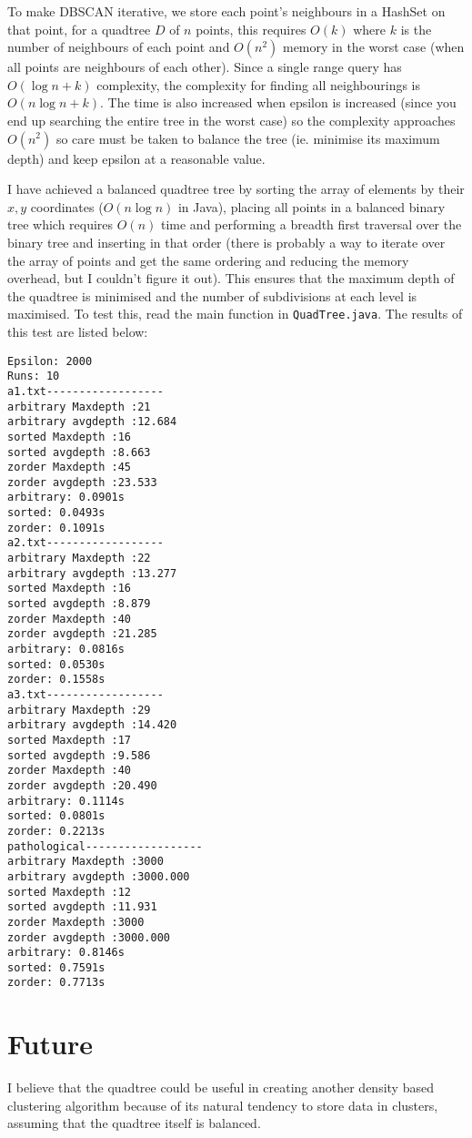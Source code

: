\documentclass{CRPITStyle}
\begin{document}
To make DBSCAN iterative, we store each point's neighbours in a HashSet on that point, for a quadtree $D$ of $n$ points, this requires $O(k)$ where $k$ is the number of neighbours of each point and $O(n^2)$ memory in the worst case (when all points are neighbours of each other). Since a single range query has $O(\log n + k)$ complexity, the complexity for finding all neighbourings is $O(n \log n + k)$. The time is also increased when epsilon is increased (since you end up searching the entire tree in the worst case) so the complexity approaches $O(n^2)$ so care must be taken to balance the tree (ie. minimise its maximum depth) and keep epsilon at a reasonable value. 

I have achieved a balanced quadtree tree by sorting the array of elements by their $x,y$ coordinates ($O(n \log n)$ in Java), placing all points in a balanced binary tree which requires $O(n)$ time and performing a breadth first traversal over the binary tree and inserting in that order (there is probably a way to iterate over the array of points and get the same ordering and reducing the memory overhead, but I couldn't figure it out). This ensures that the maximum depth of the quadtree is minimised and the number of subdivisions at each level is maximised. To test this, read the main function in \verb+QuadTree.java+. The results of this test are listed below:

\begin{verbatim}
Epsilon: 2000
Runs: 10
a1.txt------------------
arbitrary Maxdepth :21
arbitrary avgdepth :12.684
sorted Maxdepth :16
sorted avgdepth :8.663
zorder Maxdepth :45
zorder avgdepth :23.533
arbitrary: 0.0901s 
sorted: 0.0493s 
zorder: 0.1091s 
a2.txt------------------
arbitrary Maxdepth :22
arbitrary avgdepth :13.277
sorted Maxdepth :16
sorted avgdepth :8.879
zorder Maxdepth :40
zorder avgdepth :21.285
arbitrary: 0.0816s 
sorted: 0.0530s 
zorder: 0.1558s 
a3.txt------------------
arbitrary Maxdepth :29
arbitrary avgdepth :14.420
sorted Maxdepth :17
sorted avgdepth :9.586
zorder Maxdepth :40
zorder avgdepth :20.490
arbitrary: 0.1114s 
sorted: 0.0801s 
zorder: 0.2213s 
pathological------------------
arbitrary Maxdepth :3000
arbitrary avgdepth :3000.000
sorted Maxdepth :12
sorted avgdepth :11.931
zorder Maxdepth :3000
zorder avgdepth :3000.000
arbitrary: 0.8146s 
sorted: 0.7591s 
zorder: 0.7713s 
\end{verbatim}

\section{Future}
I believe that the quadtree could be useful in creating another density based clustering algorithm because of its natural tendency to store data in clusters, assuming that the quadtree itself is balanced.


  

\end{document}
